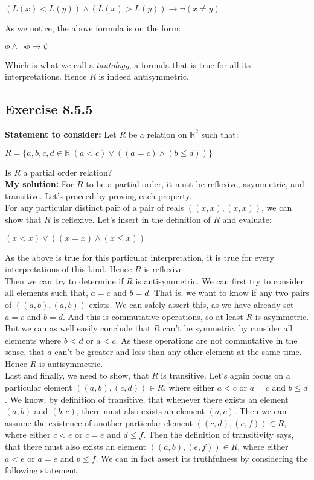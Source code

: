 \documentclass{report}
\newcommand{\cent}[1]{\begin{center}#1\end{center}}
\newcommand{\doubleR}{\mathbb{R}}
\newcommand{\In}{\! \in \!}
\newcommand{\assignmentDescription}{\textbf{Statement to consider: }}
\newcommand{\solution}{\textbf{My solution: }}
\newcommand{\QED}{\boxed{}}
\newcommand{\Exercise}[1]{\subsection{Exercise #1}}
\begin{document}
	\cent{$(L(x) < L(y)) \wedge (L(x) > L(y))\to \neg(x \neq y)$}
	
	As we notice, the above formula is on the form:
	
	\cent{$ \phi \wedge \neg \phi\to \psi$}
	
	Which is what we call a  \textit{tautology}, a formula that is true for all its interpretations. Hence $R$ is indeed antisymmetric.\\
	\QED
	
	\Exercise{8.5.5}
	\assignmentDescription
	Let $R$ be a relation on $\doubleR^2$ such that:
	
	\cent{$R = \{ a,b,c,d \In \doubleR | (a < c) \vee ((a = c) \wedge (b \leq d))\}$}
	
	Is $R$ a partial order relation?\\
	
	\solution
	For $R$ to be a partial order, it must be reflexive, asymmetric, and transitive. Let's proceed by proving each property.\\
	
	For any particular distinct pair of a pair of reals $((x,x),(x,x))$, we can show that $R$ is reflexive. Let's insert in the definition of $R$ and evaluate:
	
	\cent{$(x < x) \vee ((x = x) \wedge (x \leq x))$}
	
	As the above is true for this particular interpretation, it is true for every interpretations of this kind. Hence $R$ is reflexive.\\
	
	Then we can try to determine if $R$ is antisymmetric. We can first try to consider all elements such that, $a=c$ and $b = d$. That is, we want to know if any two pairs of  $((a,b),(a,b))$ exists. We can safely assert this, as we have already set $a=c$ and $b=d$. And this is commutative operations, so at least $R$ is asymmetric. But we can as well easily conclude that $R$ can't be symmetric, by consider all elements where $b < d$ or $a< c$. As these operations are not commutative in the sense, that $a$ can't be greater and less than any other element at the same time. Hence $R$ is antisymmetric.\\
	
	Last and finally, we need to show, that $R$ is transitive. Let's again focus on a particular element $((a,b),(c,d)) \In R$, where either $a < c$ or $a = c$ and $b \leq d$. We know, by definition of transitive, that whenever there exists an element $(a,b)$ and $(b,c)$, there must also exists an element $(a,c)$. Then we can assume the existence of another particular element $((c,d),(e,f)) \In R$, where either $c < e$  or $c=e$ and $d \leq f$. Then the definition of transitivity says, that there must also exists an element $((a,b),(e,f)) \In R$, where either $a<e$ or $a=e$ and $b \leq f$. We can in fact assert its truthfulness by considering the following statement:
	
\end{document}
